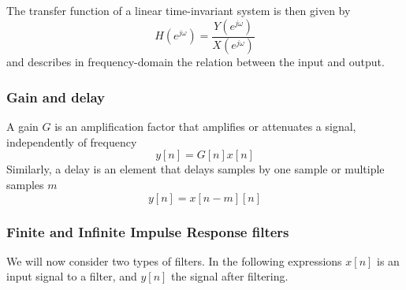 The transfer function of a linear time-invariant system is then given by
\begin{equation}
  H(e^{j\omega}) = \frac{Y(e^{j\omega})}{X(e^{j\omega})}
\end{equation}
and describes in frequency-domain the relation between the input and output.

%
%


\subsubsection{Gain and delay}
A gain $G$ is an amplification factor that amplifies or attenuates a signal, independently of frequency
\begin{equation}
  y[n] = G[n] x[n]
\end{equation}
Similarly, a delay is an element that delays samples by one sample or multiple samples $m$
\begin{equation}
  y[n] = x[n-m][n]
\end{equation}



\subsubsection{Finite and Infinite Impulse Response filters}
We will now consider two types of filters. In the following expressions $x[n]$ is an input signal to a filter, and $y[n]$ the signal after filtering.

